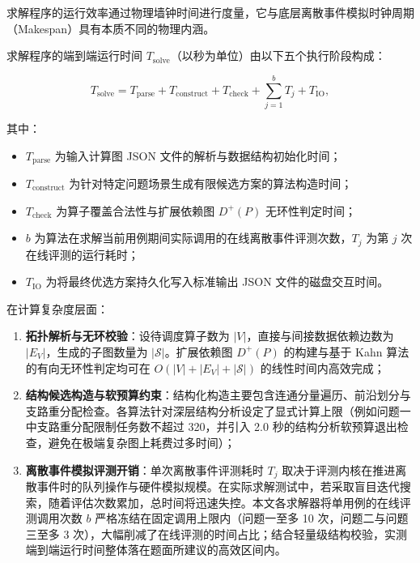\documentclass[anonymous,notoc]{gmcm2026}
\providecommand{\tightlist}{\setlength{\itemsep}{0pt}\setlength{\parskip}{0pt}}
\begin{document}
求解程序的运行效率通过物理墙钟时间进行度量，它与底层离散事件模拟时钟周期（Makespan）具有本质不同的物理内涵。

求解程序的端到端运行时间 \(T_{\mathrm{solve}}\)（以秒为单位）由以下五个执行阶段构成：

\begin{equation}
T_{\mathrm{solve}} = T_{\mathrm{parse}} + T_{\mathrm{construct}} + T_{\mathrm{check}} + \sum_{j=1}^{b} T_j + T_{\mathrm{IO}},
\end{equation}

其中：

\begin{itemize}
\tightlist
\item
  \(T_{\mathrm{parse}}\) 为输入计算图 JSON 文件的解析与数据结构初始化时间；
\item
  \(T_{\mathrm{construct}}\) 为针对特定问题场景生成有限候选方案的算法构造时间；
\item
  \(T_{\mathrm{check}}\) 为算子覆盖合法性与扩展依赖图 \(D^+(P)\) 无环性判定时间；
\item
  \(b\) 为算法在求解当前用例期间实际调用的在线离散事件评测次数，\(T_j\) 为第 \(j\) 次在线评测的运行耗时；
\item
  \(T_{\mathrm{IO}}\) 为将最终优选方案持久化写入标准输出 JSON 文件的磁盘交互时间。
\end{itemize}

在计算复杂度层面：

\begin{enumerate}
\def\labelenumi{\arabic{enumi}.}
\tightlist
\item
  \textbf{拓扑解析与无环校验}：设待调度算子数为 \(|V|\)，直接与间接数据依赖边数为 \(|E_V|\)，生成的子图数量为 \(|\mathcal{S}|\)。扩展依赖图 \(D^+(P)\) 的构建与基于 Kahn 算法的有向无环性判定均可在 \(O(|V| + |E_V| + |\mathcal{S}|)\) 的线性时间内高效完成；
\item
  \textbf{结构候选构造与软预算约束}：结构化构造主要包含连通分量遍历、前沿划分与支路重分配检查。各算法针对深层结构分析设定了显式计算上限（例如问题一中支路重分配限制任务数不超过 320，并引入 2.0 秒的结构分析软预算退出检查，避免在极端复杂图上耗费过多时间）；
\item
  \textbf{离散事件模拟评测开销}：单次离散事件评测耗时 \(T_j\) 取决于评测内核在推进离散事件时的队列操作与硬件模拟规模。在实际求解测试中，若采取盲目迭代搜索，随着评估次数累加，总时间将迅速失控。本文各求解器将单用例的在线评测调用次数 \(b\) 严格冻结在固定调用上限内（问题一至多 10 次，问题二与问题三至多 3 次），大幅削减了在线评测的时间占比；结合轻量级结构校验，实测端到端运行时间整体落在题面所建议的高效区间内。
\end{enumerate}
\end{document}
